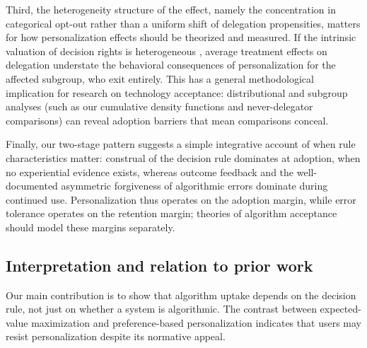 \documentclass[a4paper, 12pt, fleqn]{article}
\theoremstyle{definition}
\begin{document}
Third, the heterogeneity structure of the effect, namely the concentration in categorical opt-out rather than a uniform shift of delegation propensities, matters for how personalization effects should be theorized and measured. If the intrinsic valuation of decision rights is heterogeneous \citep{Bartling2014,Owens2014}, average treatment effects on delegation understate the behavioral consequences of personalization for the affected subgroup, who exit entirely. This has a general methodological implication for research on technology acceptance: distributional and subgroup analyses (such as our cumulative density functions and never-delegator comparisons) can reveal adoption barriers that mean comparisons conceal.

Finally, our two-stage pattern suggests a simple integrative account of when rule characteristics matter: construal of the decision rule dominates at adoption, when no experiential evidence exists, whereas outcome feedback and the well-documented asymmetric forgiveness of algorithmic errors \citep{Dietvorst2015,Renier2021} dominate during continued use. Personalization thus operates on the adoption margin, while error tolerance operates on the retention margin; theories of algorithm acceptance should model these margins separately.

\subsection{Interpretation and relation to prior work}
Our main contribution is to show that algorithm uptake depends on the decision rule, not just on whether a system is algorithmic. The contrast between expected-value maximization and preference-based personalization indicates that users may resist personalization despite its normative appeal.
\end{document}
